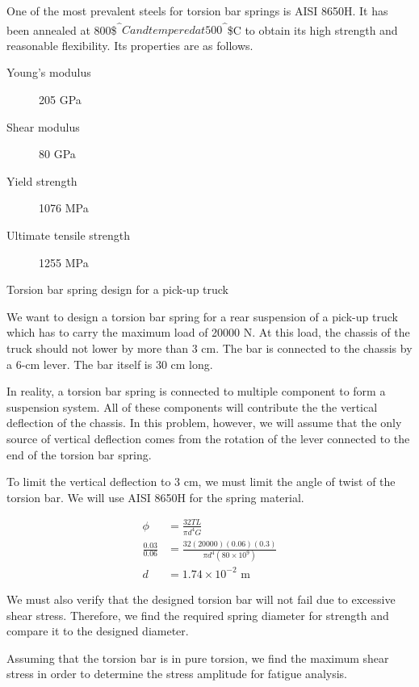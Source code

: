 \documentclass[a4paper,openany,12pt]{book}
\begin{document}
{{One of the most prevalent steels for torsion bar springs is AISI 8650H.
It has been annealed at 800\$\textsuperscript{\^{}}\(C and tempered at 500\)\textsuperscript{\^{}}\$C to
obtain its high strength and reasonable flexibility. Its properties are
as follows.

\begin{description}
\item[{Young's modulus}] 205 GPa

\item[{Shear modulus}] 80 GPa

\item[{Yield strength}] 1076 MPa

\item[{Ultimate tensile strength}] 1255 MPa
\end{description}

Torsion bar spring design for a pick-up truck

We want to design a torsion bar spring for a rear suspension of a
pick-up truck which has to carry the maximum load of 20000 N. At this
load, the chassis of the truck should not lower by more than 3 cm. The
bar is connected to the chassis by a 6-cm lever. The bar itself is 30 cm
long.

In reality, a torsion bar spring is connected to multiple component to
form a suspension system. All of these components will contribute the
the vertical deflection of the chassis. In this problem, however, we
will assume that the only source of vertical deflection comes from the
rotation of the lever connected to the end of the torsion bar spring.

To limit the vertical deflection to 3 cm, we must limit the angle of
twist of the torsion bar. We will use AISI 8650H for the spring
material.

$$\begin{aligned}
    \phi &= \frac{32TL}{\pi d^4 G} \\
    \frac{0.03}{0.06}  &= \frac{32(20000)(0.06)(0.3)}{\pi d^4 (80 \times 10^9)} \\
    d &= 1.74 \times 10^{-2} \text{ m}
  \end{aligned}$$

We must also verify that the designed torsion bar will not fail due to
excessive shear stress. Therefore, we find the required spring diameter
for strength and compare it to the designed diameter.

Assuming that the torsion bar is in pure torsion, we find the maximum
shear stress in order to determine the stress amplitude for fatigue
analysis.

}}
\end{document}
